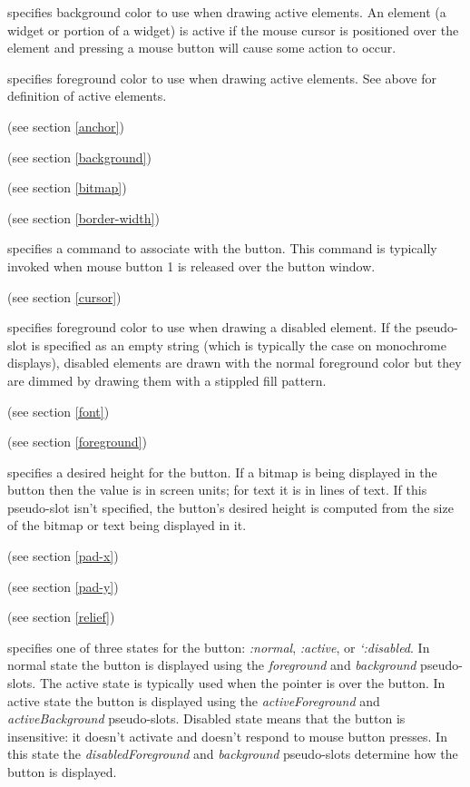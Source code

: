 \begin{ip}

\label{active-background}
specifies background color to use when drawing active elements.
An element (a widget or portion of a widget) is active if the
mouse cursor is positioned over the element and pressing a mouse button
will cause some action to occur.

\label{active-foreground}
specifies foreground color to use when drawing active elements.
See above for definition of active elements.

(see section \ref{anchor})

(see section \ref{background})

(see section \ref{bitmap})

(see section \ref{border-width})

\label{command}
specifies a command to associate with the button. This command is typically
invoked when mouse button 1 is released over the button window.

(see section \ref{cursor})

\label{disabled-foreground}
specifies foreground color to use when drawing a disabled element. If the
pseudo-slot is specified as an empty string (which is typically the case on
monochrome displays), disabled elements are drawn with the normal foreground
color but they are dimmed by drawing them with a stippled fill pattern.

(see section \ref{font})

(see section \ref{foreground})

specifies a desired height for the button. If a bitmap is being displayed in
the button then the value is in screen units; for text it is in lines of text.
If this pseudo-slot isn't specified, the button's desired height is computed from
the size of the bitmap or text being displayed in it.

(see section \ref{pad-x})

(see section \ref{pad-y})

(see section \ref{relief})

specifies one of three states for the button:  {\em :normal}, {\em :active},
or {\em `:disabled}.  In normal state the button is displayed using the
{\em foreground} and {\em background} pseudo-slots.  The active state is
typically used when the pointer is over the button.  In active state
the button is displayed using the {\em activeForeground} and
{\em activeBackground} pseudo-slots.  Disabled state means that the button
is insensitive:  it doesn't activate and doesn't respond to mouse
button presses.  In this state the {\em disabledForeground} and
{\em background} pseudo-slots determine how the button is displayed.


\end{ip}
